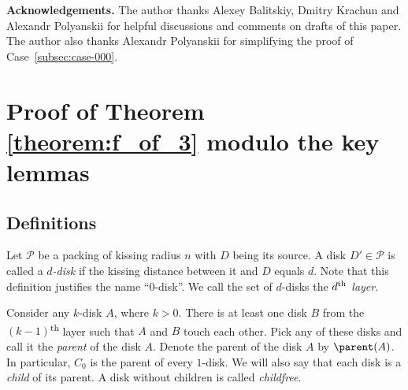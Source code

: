 
\medskip \textbf{Acknowledgements.}
The author thanks Alexey Balitskiy, Dmitry Krachun and Alexandr Polyanskii for helpful discussions and comments on drafts of this paper. The author also thanks Alexandr Polyanskii for simplifying the proof of Case~\ref{subsec:case-000}.

\section{Proof of Theorem \ref{theorem:f_of_3} modulo the key lemmas}



\subsection{Definitions}

Let $\mathcal{P}$ be a packing of kissing radius $n$ with $D$ being its source. A disk $D' \in \mathcal{P}$ is called a \textit{$d$-disk} if the kissing distance between it and $D$ equals $d$. Note that this definition justifies the name ``0-disk''. We call the set of $d$-disks the \textit{$d\textsuperscript{th}$ layer}. %

Consider any $k$-disk $A$, where $k > 0$. There is at least one disk $B$ from the $(k-1)$\textsuperscript{th} layer such that $A$ and $B$ touch each other. Pick any of these disks and call it the \textit{parent} of the disk $A$.
Denote the parent of the disk $A$ by $\parent(A)$.
In particular, $C_0$ is the parent of every $1$-disk. We will also say that each disk is a \emph{child} of its parent. A disk without children is called \emph{childfree}.

